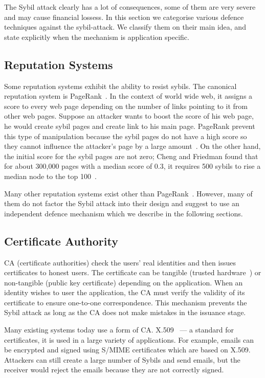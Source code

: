 The Sybil attack clearly has a lot of consequences, some of them are very severe
and may cause financial lossess. In this section we categorise various defence
techniques against the sybil-attack. We classify them on their main idea, and
state explicitly when the mechanism is application specific.

\subsection{Reputation Systems}
Some reputation systems exhibit the ability to resist sybils. The canonical
reputation system is PageRank~\cite{page1999pagerank}. In the context of world
wide web, it assigns a score to every web page depending on the number of links
pointing to it from other web pages. Suppose an attacker wants to boost the
score of his web page, he would create sybil pages and create link to his main
page. PageRank prevent this type of manipulation because the sybil pages do not
have a high score so they cannot influence the attacker's page by a large
amount~\cite{baeza2005pagerank}. On the other hand, the initial score for the
sybil pages are not zero; Cheng and Friedman found that for about 300,000 pages
with a median score of 0.3, it requires 500 sybils to rise a median node to the
top 100~\cite{cheng2006manipulability}.

Many other reputation systems exist other than
PageRank~\cite{kamvar2003eigentrust, srivatsa2005trustguard,
  nandi2005scrivener}. However, many of them do not factor the Sybil attack into
their design and suggest to use an independent defence mechanism which we
describe in the following sections.

\subsection{Certificate Authority}\label{sec:cert-authority}
CA (certificate authorities) check the users' real identities and then issues
certificates to honest users. The certificate can be tangible (trusted
hardware~\cite{newsome2004sybil}) or non-tangible (public key certificate)
depending on the application. When an identity wishes to user the application,
the CA must verify the validity of its certificate to ensure one-to-one
correspondence. This mechanism prevents the Sybil attack as long as the CA does
not make mistakes in the issuance stage.

Many existing systems today use a form of CA. X.509~\cite{housley2002internet}
--- a standard for certificates, it is used in a large variety of applications.
For example, emails can be encrypted and signed using
S/MIME\cite{ramsdell2010secure} certificates which are based on X.509. Attackers
can still create a large number of Sybils and send emails, but the receiver
would reject the emails because they are not correctly signed.

